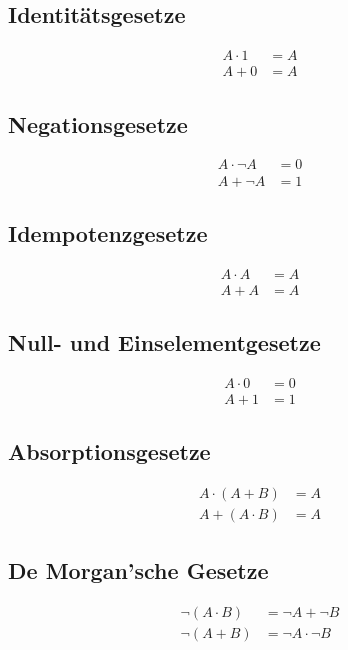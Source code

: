 \documentclass[a4paper,6pt]{article}
\begin{document}
\begin{multicols*}{3}
\subsection*{Identitätsgesetze}
\begin{align*}
A \cdot 1 & = A \\
A + 0 & = A
\end{align*}

\subsection*{Negationsgesetze}
\begin{align*}
A \cdot \lnot A & = 0 \\
A + \lnot A & = 1
\end{align*}

\subsection*{Idempotenzgesetze}
\begin{align*}
A \cdot A & = A \\
A + A & = A
\end{align*}

\subsection*{Null- und Einselementgesetze}
\begin{align*}
A \cdot 0 & = 0 \\
A + 1 & = 1
\end{align*}

\subsection*{Absorptionsgesetze}
\begin{align*}
A \cdot (A + B) & = A \\
A + (A \cdot B) & = A
\end{align*}

\subsection*{De Morgan'sche Gesetze}
\begin{align*}
\lnot (A \cdot B) & = \lnot A + \lnot B \\
\lnot (A + B) & = \lnot A \cdot \lnot B
\end{align*}

\scriptsize


\end{multicols*}
\end{document}
